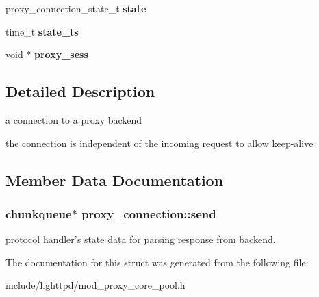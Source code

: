 \begin{CompactItemize}
\item 
\hypertarget{structproxy__connection_8d27b7e3ebf113c0d3f8d2ea7c2ccd44}{
proxy\_\-connection\_\-state\_\-t \textbf{state}}
\label{structproxy__connection_8d27b7e3ebf113c0d3f8d2ea7c2ccd44}

\item 
\hypertarget{structproxy__connection_7f1fc198a2e0fd3e2f3b83de1b02e1e1}{
time\_\-t \textbf{state\_\-ts}}
\label{structproxy__connection_7f1fc198a2e0fd3e2f3b83de1b02e1e1}

\item 
\hypertarget{structproxy__connection_07b7abb6b194634e8eed0840a8d55137}{
void $\ast$ \textbf{proxy\_\-sess}}
\label{structproxy__connection_07b7abb6b194634e8eed0840a8d55137}

\end{CompactItemize}


\subsection{Detailed Description}
a connection to a proxy backend

the connection is independent of the incoming request to allow keep-alive 

\subsection{Member Data Documentation}
\hypertarget{structproxy__connection_f950123a510466cda48da6724fd12be5}{
\subsubsection[{send}]{\setlength{\rightskip}{0pt plus 5cm}chunkqueue$\ast$ {\bf proxy\_\-connection::send}}}
\label{structproxy__connection_f950123a510466cda48da6724fd12be5}


protocol handler's state data for parsing response from backend. 

The documentation for this struct was generated from the following file:\begin{CompactItemize}
\item 
include/lighttpd/mod\_\-proxy\_\-core\_\-pool.h\end{CompactItemize}
